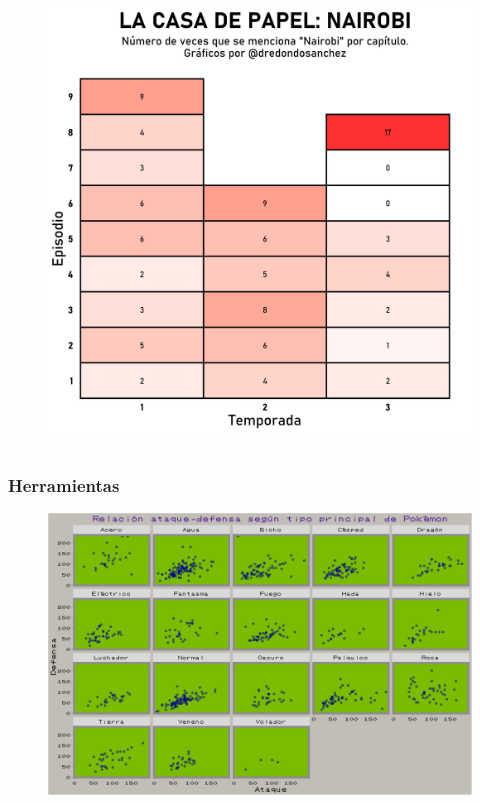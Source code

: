 \documentclass{beamer}
\begin{document}
\begin{frame}
\begin{columns}
\begin{column}{0.5\textwidth}
\begin{figure}
				\includegraphics[width=\textwidth]{images/16.png}
			\end{figure}
		\end{column}
	\end{columns}	
\end{frame}


\begin{frame}\frametitle{Herramientas}
	\begin{figure}
		\centering
		\includegraphics[width=.95\textwidth]{images/4.png}
	\end{figure}
\end{frame}
\end{document}
